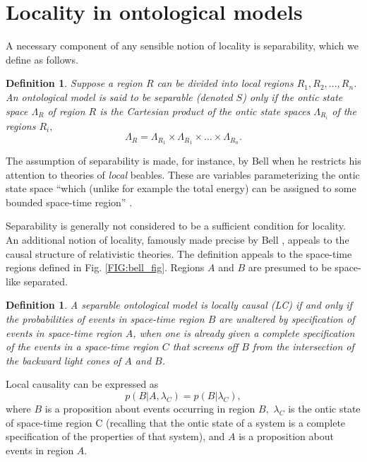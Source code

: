 \documentclass[aps,nofootinbib,12pt]{revtex4-2}
\newtheorem{definition}[theorem]{Definition}
\begin{document}
\section{Locality in ontological models \label{SEC:locality}}

A necessary component of any sensible notion of locality is
separability, which we define as follows.
\begin{definition}
Suppose a region $R$ can be divided into local regions $R_{1},R_{2},...,R_{n}%
$. An ontological model is said to be \emph{separable} (denoted $S$) only if
the ontic state space $\Lambda_{R}$ of region $R$ is the Cartesian product of
the ontic state spaces $\Lambda_{R_{i}}$ of the regions $R_{i},$%
\[
\Lambda_{R}=\Lambda_{R_{1}}\times\Lambda_{R_{1}}\times\dots\times
\Lambda_{R_{n}}.
\]
\label{DEF:separable}
\end{definition}
The assumption of separability is made, for instance, by Bell when
he restricts his attention to theories of \textit{local} beables.
These are variables parameterizing the ontic state space ``which
(unlike for example the total energy) can be assigned to some
bounded space-time region'' \cite{bell_quoteonseparability}.

Separability is generally not considered to be a sufficient
condition for locality. An additional notion of locality, famously
made precise by Bell \cite{Bell_cuisine,bell_beables}, appeals to
the causal structure of relativistic theories.  The definition
appeals to the space-time regions defined in Fig.
\ref{FIG:bell_fig}.  Regions $A$ and $B$ are presumed to be
space-like separated.
\begin{definition}
A separable ontological model is \emph{locally causal} (LC) if and
only if the probabilities of events in space-time region $B$ are
unaltered by specification of events in space-time region $A$, when
one is already given a complete specification of the events in a
space-time region $C$ that screens off $B$ from the intersection of
the backward light cones of $A$ and $B$.
\label{DEF:locally_causal}
\end{definition}
Local causality can be expressed as
\begin{equation}
p(B|A,\lambda_{C})=p(B|\lambda_{C}),
\end{equation}
where $B$ is a proposition about events occurring in region $B,$
$\lambda _{C}$ is the ontic state of space-time region C (recalling
that the ontic state of a system is a complete specification of the
properties of that system), and $A$ is a proposition about events in
region $A$.
\end{document}
